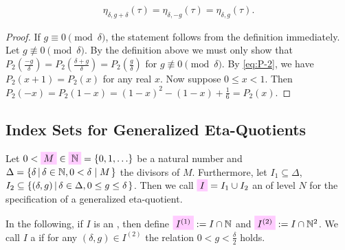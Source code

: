 \documentclass{article}
\begin{document}
\begin{Lemma}\label{thm:eta_delta-g/2}
  \begin{gather*}
    \eta_{\delta,g+\delta}(\tau)
      =
      \eta_{\delta,-g}(\tau)
      =
      \eta_{\delta,g}(\tau).
      \label{eq:eta_delta-g^[R](tau)-mod-delta}
  \end{gather*}
\end{Lemma}
\begin{proof}
  If $g \equiv 0 \pmod{\delta}$, the statement follows from the
  definition immediately.
  Let $g \not\equiv 0 \pmod{\delta}$.
  By the definition above we must only show that
  $P_2\left(\frac{-g}{\delta}\right) =
  P_2\left(\frac{\delta+g}{\delta}\right) =
  P_2\left(\frac{g}{\delta}\right)$ for
  $g \not\equiv 0 \pmod{\delta}$.
%
  By \eqref{eq:P-2}, we have $P_2(x+1) = P_2(x)$ for any real $x$.
  Now suppose $0\le x<1$. Then
  $
    P_2(-x)
    = P_2(1-x)
    = (1-x)^2 - (1-x) + \frac{1}{6}
    = P_2(x).
    $
\end{proof}










\subsection{Index Sets for Generalized Eta-Quotients}

\begin{Definition}
  \label{def:index-set}
  Let
  $0<\defineNotation{M}\in\defineNotation[N]{\setN}=\Set{0,1,\ldots}$
  be a natural number and
  $\Delta=\SetDef{\delta}{\delta\in\setN,0<\divides{\delta}{M}}$ the
  divisors of $M$.
%
  Furthermore, let $I_1 \subseteq \Delta$,
  $I_2 \subseteq \SetDef{(\delta,g)}{\delta\in\Delta,0\le g\le
    \delta}$. Then we call $\defineNotation[I]{I} = I_1 \cup I_2$ an
   of level $N$ for the specification of a
  generalized eta-quotient.

  In the following, if $I$ is an , then define
  $\defineNotation[I-1]{I^{(1)}} := I\cap\setN$ and
  $\defineNotation[I-2]{I^{(2)}} := I \cap \setN^2$.
%
  We call $I$ a  if for any
  $(\delta,g) \in I^{(2)}$ the relation $0<g<\frac{\delta}{2}$ holds.
\end{Definition}
\end{document}

